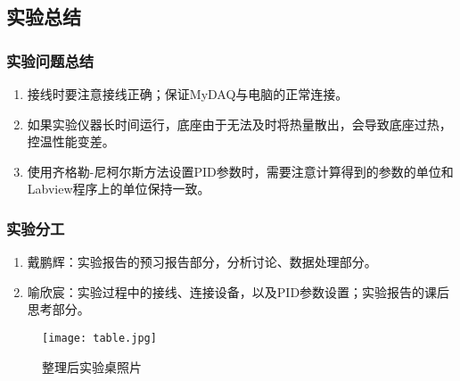 \documentclass[dvipsnames, svgnames,a4paper,11pt]{article}
\begin{document}
\clearpage

\subsection{实验总结}
    
    \subsubsection{实验问题总结}

        \begin{enumerate}
            \item 接线时要注意接线正确；保证MyDAQ与电脑的正常连接。
            \item 如果实验仪器长时间运行，底座由于无法及时将热量散出，会导致底座过热，控温性能变差。
            \item 使用齐格勒-尼柯尔斯方法设置PID参数时，需要注意计算得到的参数的单位和Labview程序上的单位保持一致。
        \end{enumerate}

    \subsubsection{实验分工}

        \begin{enumerate}
            \item 戴鹏辉：实验报告的预习报告部分，分析讨论、数据处理部分。
            \item 喻欣宸：实验过程中的接线、连接设备，以及PID参数设置；实验报告的课后思考部分。
        \end{enumerate}

    \begin{figure}[htbp]
        \centering
        \texttt{[image: table.jpg]}
        \caption{整理后实验桌照片}
        \label{fig:table}
    \end{figure}
\end{document}
